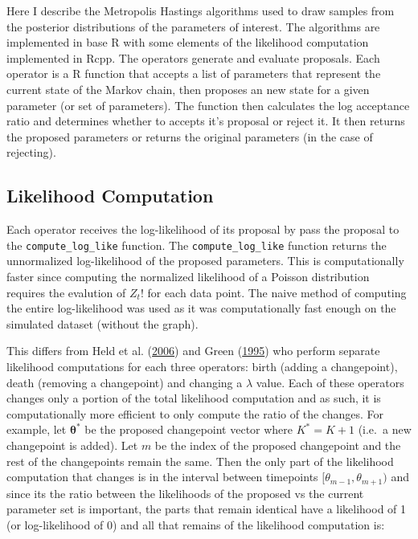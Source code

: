 \documentclass[11pt,a4paper]{article}
\numberwithin{equation}{section}
\begin{document}
Here I describe the Metropolis Hastings algorithms used to draw samples
from the posterior distributions of the parameters of interest. The
algorithms are implemented in base R with some elements of the
likelihood computation implemented in Rcpp. The operators generate and
evaluate proposals. Each operator is a R function that accepts a list of
parameters that represent the current state of the Markov chain, then
proposes an new state for a given parameter (or set of parameters). The
function then calculates the log acceptance ratio and determines whether
to accepts it's proposal or reject it. It then returns the proposed
parameters or returns the original parameters (in the case of
rejecting).

\hypertarget{likelihood-computation}{%
\subsection{Likelihood Computation}\label{likelihood-computation}}

Each operator receives the log-likelihood of its proposal by pass the
proposal to the \texttt{compute\_log\_like} function. The
\texttt{compute\_log\_like} function returns the unnormalized
log-likelihood of the proposed parameters. This is computationally
faster since computing the normalized likelihood of a Poisson
distribution requires the evalution of \(Z_{t}!\) for each data point.
The naive method of computing the entire log-likelihood was used as it
was computationally fast enough on the simulated dataset (without the
graph).

This differs from Held et al.
(\protect\hyperlink{ref-held_two-component_2006}{2006}) and Green
(\protect\hyperlink{ref-green_reversible_1995}{1995}) who perform
separate likelihood computations for each three operators: birth (adding
a changepoint), death (removing a changepoint) and changing a
\(\lambda\) value. Each of these operators changes only a portion of the
total likelihood computation and as such, it is computationally more
efficient to only compute the ratio of the changes. For example, let
\(\boldsymbol{\theta^*}\) be the proposed changepoint vector where
\(K^* = K + 1\) (i.e.~a new changepoint is added). Let \(m\) be the
index of the proposed changepoint and the rest of the changepoints
remain the same. Then the only part of the likelihood computation that
changes is in the interval between timepoints
\([\theta_{m-1}, \theta_{m+1})\) and since its the ratio between the
likelihoods of the proposed vs the current parameter set is important,
the parts that remain identical have a likelihood of 1 (or
log-likelihood of 0) and all that remains of the likelihood computation
is:
\end{document}
